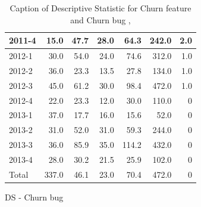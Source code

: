\documentclass[UKenglish]{ifimaster}  %
\begin{document}
\begin{appendices}
\begin{table}[!htbp]
\begin{adjustwidth}{-2.5cm}{}
\begin{subfigure}[b]{0.3\textwidth}
{\begin{tabular}{ | l | r | r | r | r | r | r | }
2011-4 & 15.0 & 47.7 & 28.0 & 64.3 & 242.0 & 2.0\\ \hline
2012-1 & 30.0 & 54.0 & 24.0 & 74.6 & 312.0 & 1.0\\ \hline
2012-2 & 36.0 & 23.3 & 13.5 & 27.8 & 134.0 & 1.0\\ \hline
2012-3 & 45.0 & 61.2 & 30.0 & 98.4 & 472.0 & 1.0\\ \hline
2012-4 & 22.0 & 23.3 & 12.0 & 30.0 & 110.0 & 0\\ \hline
2013-1 & 37.0 & 17.7 & 16.0 & 15.6 & 52.0 & 0\\ \hline
2013-2 & 31.0 & 52.0 & 31.0 & 59.3 & 244.0 & 0\\ \hline
2013-3 & 36.0 & 85.9 & 35.0 & 114.2 & 432.0 & 0\\ \hline
2013-4 & 28.0 & 30.2 & 21.5 & 25.9 & 102.0 & 0\\ \hline
Total & 337.0 & 46.1 & 23.0 & 70.4 & 472.0 & 0\\ \hline

\end{tabular}
}
\caption{DS - Churn bug}
 \label{DS:CB:9}
\end{subfigure}
\end{adjustwidth}
\caption[Optional caption for list of figures]{Caption of Descriptive Statistic for Churn feature and Churn bug  , }
\label{DS:9:4} %
\end{table}




\end{appendices}
\end{document}
